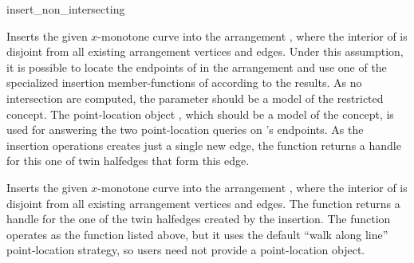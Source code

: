 
\begin{ccRefFunction}{insert_non_intersecting}


   {Inserts the given $x$-monotone curve  into the arrangement
    , where the interior of  is disjoint from all existing
    arrangement vertices and edges. Under this assumption, it is possible to
    locate the endpoints of  in the arrangement and use one of the
    specialized insertion member-functions of  according to the
    results. As no intersection are computed, the  parameter
    should be a model of the restricted  concept.
    The point-location object , which should be a model of the
     concept, is used for answering
    the two point-location queries on 's endpoints. As the insertion
    operations creates just a single new edge, the function returns a handle
    for this one of twin halfedges that form this edge.
    }

   {Inserts the given $x$-monotone curve  into the arrangement
    , where the interior of  is disjoint from all existing
    arrangement vertices and edges. The function returns a handle for the
    one of the twin halfedges created by the insertion.
    The function operates as the function listed above, but it uses the default
    ``walk along line'' point-location strategy, so users need not provide a
    point-location object.}


\end{ccRefFunction}
